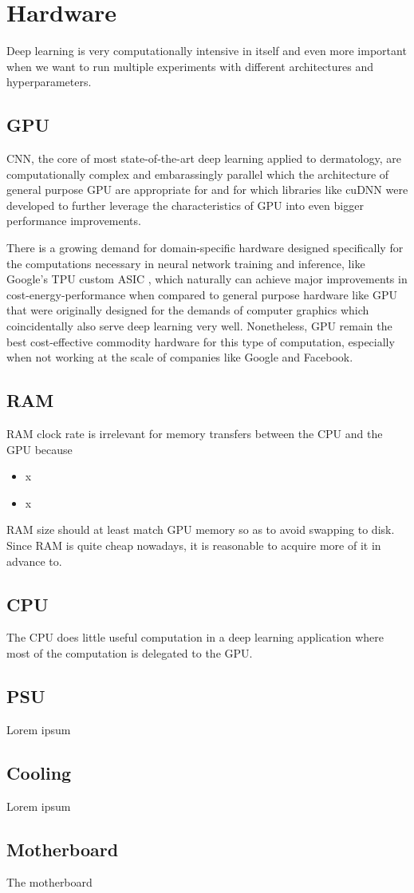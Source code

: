 \chapter{Hardware}
\label{chapter:hardware}

Deep learning is very computationally intensive in itself and even more important when we want to run multiple experiments with different architectures and hyperparameters.

\section{GPU}
\ac{CNN}, the core of most state-of-the-art deep learning applied to dermatology, are computationally complex and embarassingly parallel \cite{chang2017} which the architecture of general purpose \ac{GPU} are appropriate for \cite{gpu} and for which libraries like cuDNN \cite{cudnn} were developed to further leverage the characteristics of \ac{GPU} into even bigger performance improvements.

There is a growing demand for domain-specific hardware designed specifically for the computations necessary in neural network training and inference, like Google's TPU custom ASIC \cite{tpu}, which naturally can achieve major improvements in cost-energy-performance when compared to general purpose hardware like \ac{GPU} that were originally designed for the demands of computer graphics which coincidentally also serve deep learning very well. Nonetheless, \ac{GPU} remain the best cost-effective commodity hardware for this type of computation, especially when not working at the scale of companies like Google and Facebook.

\section{RAM}
RAM clock rate is irrelevant for memory transfers between the CPU and the GPU because

\begin{itemize}
    \item x
    \item x
\end{itemize}

RAM size should at least match GPU memory so as to avoid swapping to disk. Since RAM is quite cheap nowadays, it is reasonable to acquire more of it in advance to.

\section{CPU}
The CPU does little useful computation in a deep learning application where most of the computation is delegated to the GPU.

\section{PSU}
Lorem ipsum

\section{Cooling}
Lorem ipsum

\section{Motherboard}
The motherboard
